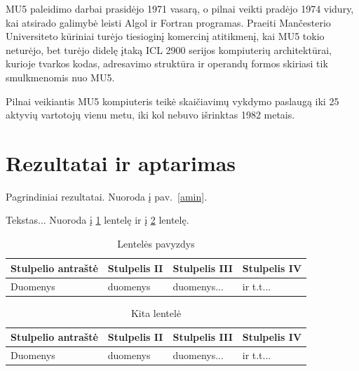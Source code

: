 \documentclass[a4paper,lithuanian]{article}
\begin{document}
MU5 paleidimo darbai prasidėjo 1971 vasarą, o pilnai veikti pradėjo 1974 vidury, kai atsirado galimybė leisti Algol ir Fortran programas. Praeiti Mančesterio Universiteto kūriniai turėjo tiesioginį komercinį atitikmenį, kai MU5 tokio neturėjo, bet turėjo didelę įtaką ICL 2900 serijos kompiuterių architektūrai, kurioje tvarkos kodas, adresavimo struktūra ir operandų formos skiriasi tik smulkmenomis nuo MU5. \newline

Pilnai veikiantis MU5 kompiuteris teikė skaičiavimų vykdymo paslaugą iki 25 aktyvių vartotojų vienu metu, iki kol nebuvo išrinktas 1982 metais.




\section{Rezultatai ir aptarimas}

Pagrindiniai rezultatai. Nuoroda į pav.~\ref{amin}.



Tekstas... Nuoroda į \ref{tab} lentelę ir į \ref{another-tab} lentelę.

\begin{table}[ht]
  \caption{Lentelės pavyzdys}
  \label{tab}
  \begin{tabular}{|l|l|l|l|}
    \hline
    Stulpelio antraštė & Stulpelis II & Stulpelis III & Stulpelis IV \\
    \hline
    Duomenys & duomenys & duomenys...  & ir t.t... \\
    \hline
  \end{tabular}
\end{table}

\begin{table}[ht]
  \caption{Kita lentelė}
  \label{another-tab}
  \begin{tabular}{|l|l|l|l|}
    \hline
    Stulpelio antraštė & Stulpelis II & Stulpelis III & Stulpelis IV \\
    \hline
    Duomenys & duomenys & duomenys...  & ir t.t... \\
    \hline
  \end{tabular}
\end{table}

\end{document}
